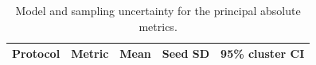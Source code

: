\begin{table}[H]
\caption{Model and sampling uncertainty for the principal absolute metrics.}
\label{tab:absolute_uncertainty}
\centering
\footnotesize
\renewcommand{\arraystretch}{1.08}
\begin{tabularx}{\textwidth}{@{}>{\RaggedRight\arraybackslash}p{2.55cm} >{\RaggedRight\arraybackslash}X c c c@{}}
\toprule
\textbf{Protocol} & \textbf{Metric} & \textbf{Mean} & \textbf{Seed SD} & \textbf{95\% cluster CI}\\
\midrule
\bottomrule
\end{tabularx}
\par\vspace{2pt}{\scriptsize Cluster intervals use 1000 repetitions (seed 20260825). UAV-SEAD resamples complete test logs, ALFA resamples sequences, and Uncategorized screening resamples flights.}
\end{table}